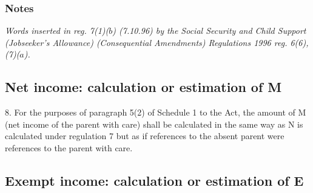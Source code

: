 \documentclass[a4paper]{article}
\newcommand\amendment[1]{\subsubsection*{Notes}{\itshape\frenchspacing\footnotesize #1 \par\goodbreak}}
\begin{document}
\amendment{
Words inserted in reg. 7(1)($b$) (7.10.96) by the Social Security and Child Support (Jobseeker's Allowance) (Consequential Amendments) Regulations 1996 reg. 6(6), (7)($a$).
}

\subsection[8. Net income: calculation or estimation of M]{Net income: calculation or estimation of M}

8.  For the purposes of paragraph 5(2) of Schedule 1 to the Act, the amount of M (net income of the parent with care) shall be calculated in the same way as N is calculated under regulation 7 but as if references to the absent parent were references to the parent with care.

\subsection[9. Exempt income: calculation or estimation of E]{Exempt income: calculation or estimation of E}
\end{document}
